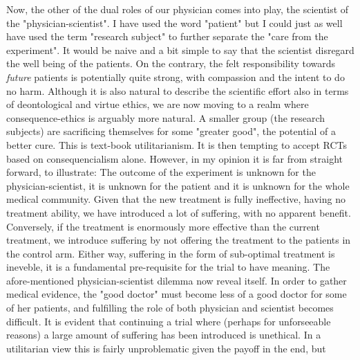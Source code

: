 \documentclass[12p]{article}
\begin{document}
Now, the other of the dual roles of our physician comes into play, the scientist of the "physician-scientist".
I have used the word "patient" but I could just as well have used the term "research subject" to further separate the "care from the experiment".
It would be naive and a bit simple to say that the scientist disregard the well being of the patients.
On the contrary, the felt responsibility towards \emph{future} patients is potentially quite strong, with compassion and the intent to do no harm.
Although it is also natural to describe the scientific effort also in terms of deontological and virtue ethics, we are now moving to a realm where consequence-ethics is arguably more natural.
A smaller group (the research subjects) are sacrificing themselves for some "greater good", the potential of a better cure.
This is text-book utilitarianism.%
It is then tempting to accept RCTs based on consequencialism alone.
However, in my opinion it is far from straight forward, to illustrate:
The outcome of the experiment is unknown for the physician-scientist, it is unknown for the patient and it is unknown for the whole medical community.
Given that the new treatment is fully ineffective, having no treatment ability, we have introduced a lot of suffering, with no apparent benefit.
Conversely, if the treatment is enormously more effective than the current treatment, we introduce suffering by not offering the treatment to the patients in the control arm.
Either way, suffering in the form of sub-optimal treatment is ineveble, it is a fundamental pre-requisite for the trial to have meaning.
The afore-mentioned physician-scientist dilemma now reveal itself.
In order to gather medical evidence, the "good doctor" must become less of a good doctor for some of her patients, and fulfilling the role of both physician and scientist becomes difficult.
It is evident that continuing a trial where (perhaps for unforseeable reasons) a large amount of suffering has been introduced is unethical.
In a utilitarian view this is fairly unproblematic given the payoff in the end, but 


\end{document}
